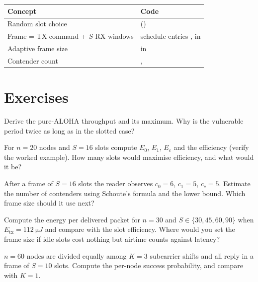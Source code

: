 \begin{codemap}
\small
\begin{tabularx}{\linewidth}{@{}>{\ttfamily}p{5.2cm}X@{}}
\toprule
\normalfont\bfseries Concept & \normalfont\bfseries Code\\
\midrule
Random slot choice & \codew{BackscatterModule.handle_command} (\codew{random.randint})\\
Frame = TX command + $S$ RX windows & schedule entries \code{("tx",...)}, \code{("rx",...)} in \file{bsengine.py}\\
Adaptive frame size & \codew{adaptive_aloha_policy} in \file{custom_protocol_demo.py}\\
Contender count & \codew{decoded_this_frame}, \codew{total_collided}\\
\bottomrule
\end{tabularx}
\end{codemap}

\section*{Exercises}
\begin{exercise}
Derive the pure-ALOHA throughput and its maximum. Why is the vulnerable period twice as long as in the slotted case?
\end{exercise}
\begin{exercise}
For $n=20$ nodes and $S=16$ slots compute $E_0$, $E_1$, $E_c$ and the efficiency (verify the worked example). How many slots would maximise efficiency, and what would it be?
\end{exercise}
\begin{exercise}
After a frame of $S=16$ slots the reader observes $c_0=6$, $c_1=5$, $c_c=5$. Estimate the number of contenders using Schoute's formula and the lower bound. Which frame size should it use next?
\end{exercise}
\begin{exercise}
Compute the energy per delivered packet for $n=30$ and $S\in\{30,45,60,90\}$ when $E_{\mathrm{tx}}=\SI{112}{\micro J}$ and compare with the slot efficiency. Where would you set the frame size if idle slots cost nothing but airtime counts against latency?
\end{exercise}
\begin{exercise}
$n=60$ nodes are divided equally among $K=3$ subcarrier shifts and all reply in a frame of $S=10$ slots. Compute the per-node success probability, and compare with $K=1$.
\end{exercise}
